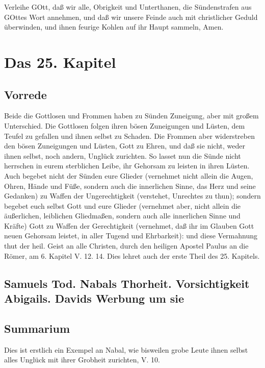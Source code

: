 Verleihe GOtt, daß wir alle, Obrigkeit und Unterthanen, die Sündenstrafen aus GOttes Wort annehmen, und daß wir unsere Feinde auch mit christlicher Geduld überwinden, und ihnen feurige Kohlen auf ihr Haupt sammeln, Amen.

\chapter{Das 25. Kapitel}

\section{Vorrede}

Beide die Gottlosen und Frommen haben zu Sünden Zuneigung, aber mit großem Unterschied. Die Gottlosen folgen ihren bösen Zuneigungen und Lüsten, dem Teufel zu gefallen und ihnen selbst zu Schaden. Die Frommen aber widerstreben den bösen Zuneigungen und Lüsten, Gott zu Ehren, und daß sie nicht, weder ihnen selbst, noch andern, Unglück zurichten. So lasset nun die Sünde nicht herrschen in eurem sterblichen Leibe, ihr Gehorsam zu leisten in ihren Lüsten. Auch begebet nicht der Sünden eure Glieder (vernehmet nicht allein die Augen, Ohren, Hände und Füße, sondern auch die innerlichen Sinne, das Herz und seine Gedanken) zu Waffen der Ungerechtigkeit (verstehet, Unrechtes zu thun); sondern begebet euch selbst Gott und eure Glieder (vernehmet aber, nicht allein die äußerlichen, leiblichen Gliedmaßen, sondern auch alle innerlichen Sinne und Kräfte) Gott zu Waffen der Gerechtigkeit (vernehmet, daß ihr im Glauben Gott neuen Gehorsam leistet, in aller Tugend und Ehrbarkeit): und diese Vermahnung thut der heil. Geist an alle Christen, durch den heiligen Apostel Paulus an die Römer, am 6. Kapitel V. 12. 14. Dies lehret auch der erste Theil des 25. Kapitels.

\section[Samuels Tod. Nabals Thorheit. Vorsichtigkeit Abigails. Davids Werbung]{Samuels Tod. Nabals Thorheit. Vorsichtigkeit Abigails. Davids Werbung um sie}

\section{Summarium}

Dies ist erstlich ein Exempel an Nabal, wie bisweilen grobe Leute ihnen selbst alles Unglück mit ihrer Grobheit zurichten, V. 10.

